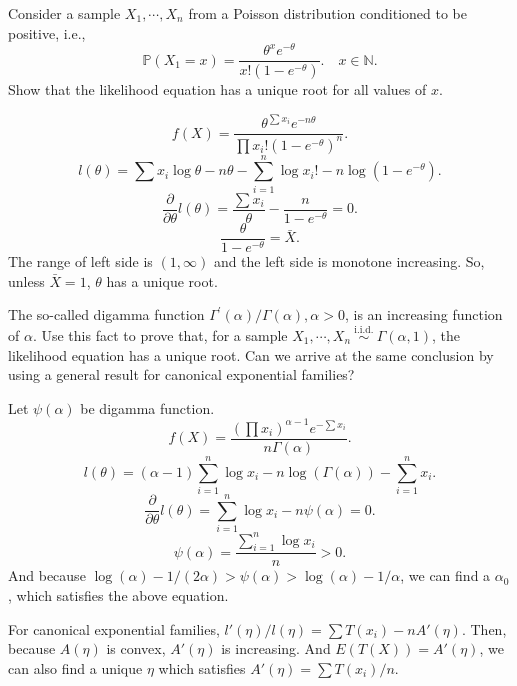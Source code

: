 \begin{ex}
    Consider a sample \(X_{1}, \cdots, X_{n}\) from a Poisson distribution conditioned to be positive, i.e.,
    \[
        \mathbb{P}\left(X_{1}=x\right)=\frac{\theta^{x} e^{-\theta}}{x !\left(1-e^{-\theta}\right)} . \quad x \in \mathbb{N} .
    \]
    Show that the likelihood equation has a unique root for all values of \(x\). 
\end{ex}

\begin{solution}
    \[
        f(X)=\frac{\theta^{\sum x_i} e^{-n\theta}}{\prod x_i! (1-e^{-\theta})^n}. 
    \]
    \[
        l(\theta)=\sum x_i \log \theta-n\theta-\sum_{i=1}^n\log x_i!-n\log (1-e^{-\theta}). 
    \]
    \[
        \frac{\partial}{\partial\theta}l(\theta)=\frac{\sum x_i}{\theta}-\frac{n}{1-e^{-\theta}}=0. 
    \]
    \[
        \frac{\theta}{1-e^{-\theta}}=\bar{X}. 
    \]
    The range of left side is $(1, \infty)$ and the left side is monotone increasing. So, unless $\bar{X}=1$, $\theta$ has a unique root. 
\end{solution}

\begin{ex}
    The so-called digamma function \(\Gamma^{\prime}(\alpha) / \Gamma(\alpha), \alpha>0\), is an increasing function of \(\alpha\). Use this fact to prove that, for a sample \(X_{1}, \cdots, X_{n} \stackrel{\text { i.i.d. }}{\sim} \Gamma(\alpha, 1)\), the likelihood equation has a unique root. Can we arrive at the same conclusion by using a general result for canonical exponential families?
\end{ex}

\begin{solution}
    Let $\psi(\alpha)$ be digamma function. 
    \[
        f(X)=\frac{(\prod x_i)^{\alpha-1}e^{-\sum x_i}}{n\Gamma(\alpha)}. 
    \]
    \[
        l(\theta)=(\alpha-1)\sum_{i=1}^n \log x_i-n\log (\Gamma(\alpha))-\sum_{i=1}^n x_i. 
    \]
    \[
        \frac{\partial}{\partial\theta}l(\theta)=\sum_{i=1}^n\log x_i-n\psi(\alpha)=0. 
    \]
    \[
        \psi(\alpha)=\frac{\sum_{i=1}^n \log x_i}{n}>0. 
    \]
    And because $\log (\alpha)-1/(2\alpha)>\psi(\alpha)>\log (\alpha)-1/\alpha$, we can find a $\alpha_0$, which satisfies the above equation. 

    \noindent For canonical exponential families, $l'(\eta)/l(\eta)=\sum T(x_i)-nA'(\eta)$. Then, because $A(\eta)$ is convex, $A'(\eta)$ is increasing. And $E(T(X))=A'(\eta)$, we can also find a unique $\eta$ which satisfies $A'(\eta)=\sum T(x_i)/n$. 
\end{solution}

